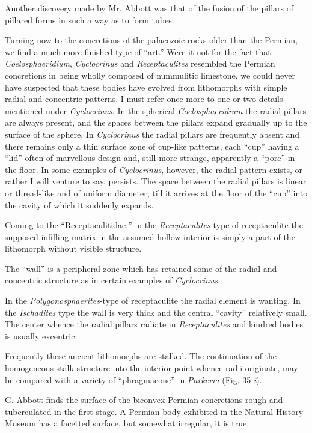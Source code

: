 \documentclass[a4paper, 12pt, oneside]{article}
\begin{document}
Another discovery made by Mr. Abbott was that of the fusion of the pillars of pillared forms in such a way as to form tubes.

Turning now to the concretions of the palaeozoic rocks older than the Permian, we find a much more finished type of ``art.'' Were it not for the fact that \emph{Coelosphaeridium}, \emph{Cyclocrinus} and \emph{Receptaculites} resembled the Permian concretions in being wholly composed of nummulitic limestone, we could never have suspected that these bodies have evolved from lithomorphs with simple radial and concentric patterns. I must refer once more to one or two details mentioned under \emph{Cyclocrinus}. In the spherical \emph{Coelosphaeridium} the radial pillars are always present, and the spaces between the pillars expand gradually up to the surface of the sphere. In \emph{Cyclocrinus} the radial pillars are frequently absent and there remains only a thin surface zone of cup-like patterns, each ``cup'' having a ``lid'' often of marvellous design and, still more strange, apparently a ``pore'' in the floor. In some examples of \emph{Cyclocrinus}, however, the radial pattern exists, or rather I will venture to say, persists. The space between the radial pillars is linear or thread-like and of uniform diameter, till it arrives at the floor of the ``cup'' into the cavity of which it suddenly expands.

Coming to the ``Receptaculitidae,'' in the \emph{Receptaculites}-type of receptaculite the supposed infilling matrix in the assumed hollow interior is simply a part of the lithomorph without visible structure.

The ``wall'' is a peripheral zone which has retained some of the radial and concentric structure as in certain examples of \emph{Cyclocrinus}.

In the \emph{Polygonosphaerites}-type of receptaculite the radial element is wanting. In the \emph{Ischadites} type the wall is very thick and the central ``cavity'' relatively small. The center whence the radial pillars radiate in \emph{Receptaculites} and kindred bodies is usually excentric.

Frequently these ancient lithomorphs are stalked. The continuation of the homogeneous stalk structure into the interior point whence radii originate, may be compared with a variety of ``phragmacone'' in \emph{Parkeria} (Fig. 35 \emph{i}).

G. Abbott finds the surface of the biconvex Permian concretions rough and tuberculated in the first stage. A Permian body exhibited in the Natural History Museum has a facetted surface, but somewhat irregular, it is true.
\end{document}
